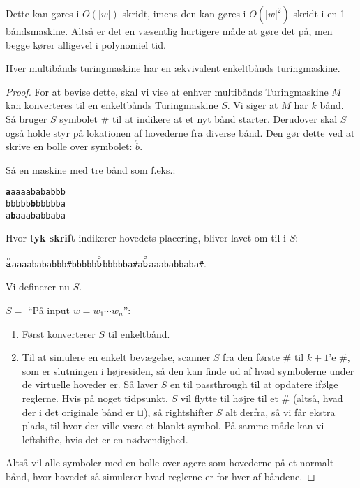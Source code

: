Dette kan gøres i $O(|w|)$ skridt, imens den kan gøres i $O(|w|^{2})$ skridt i en 1-båndsmaskine. Altså er det en væsentlig hurtigere måde at gøre det på, men begge kører alligevel i polynomiel tid.


\begin{theorem}
	\label{teo:multitapeequiv}
	Hver multibånds turingmaskine har en ækvivalent enkeltbånds turingmaskine.
\end{theorem}

\begin{proof}
	For at bevise dette, skal vi vise at enhver multibånds Turingmaskine $M$ kan konverteres til en enkeltbånds Turingmaskine $S$. Vi siger at $M$ har $k$ bånd. Så bruger $S$ symbolet \# til at indikere at et nyt bånd starter. Derudover skal $S$ også holde styr på lokationen af hovederne fra diverse bånd. Den gør dette ved at skrive en bolle over symbolet: $\mathring{b}$.

	Så en maskine med tre bånd som f.eks.:\\
	\begin{center}
		\noindent
		\texttt{\textbf{a}aaaabababbb}\\
		\noindent
		\texttt{bbbbb\textbf{b}bbbbba}\\
		\noindent
		\texttt{a\textbf{b}aaababbaba}\\
	\end{center}
	Hvor \textbf{tyk skrift} indikerer hovedets placering, bliver lavet om til i $S$:
	\begin{center}
		\texttt{$\stackrel{\circ}{\text{\texttt{a}}}$aaaabababbb\#bbbbb$\stackrel{\circ}{\text{\texttt{b}}}$bbbbba\#a$\stackrel{\circ}{\text{\texttt{b}}}$aaababbaba\#}.
	  \end{center}

	Vi definerer nu $S$.

	$S = $ ``På input $w = w_{1} \cdots w_{n}$'':
	\begin{enumerate}
		\item Først konverterer $S$ til enkeltbånd.
		\item Til at simulere en enkelt bevægelse, scanner $S$ fra den første \# til $k+1$'e \#, som er slutningen i højresiden, så den kan finde ud af hvad symbolerne under de virtuelle hoveder er. Så laver $S$ en til passthrough til at opdatere ifølge reglerne. Hvis på noget tidpsunkt, $S$ vil flytte til højre til et $\#$ (altså, hvad der i det originale bånd er $\sqcup$), så rightshifter $S$ alt derfra, så vi får ekstra plads, til hvor der ville være et blankt symbol. På samme måde kan vi leftshifte, hvis det er en nødvendighed.
	\end{enumerate}

	Altså vil alle symboler med en bolle over agere som hovederne på et normalt bånd, hvor hovedet så simulerer hvad reglerne er for hver af båndene.
\end{proof}

